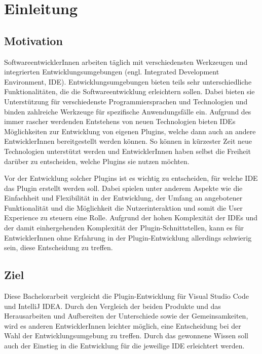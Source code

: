 \chapter{Einleitung}
\label{cha:Einleitung}


\section{Motivation}
\label{sec:Motivation}

SoftwareentwicklerInnen arbeiten täglich mit verschiedensten 
Werkzeugen und integrierten Entwicklungsumgebungen 
(engl. Integrated Development Environment, IDE). Entwicklungsumgebungen 
bieten teils sehr unterschiedliche Funktionalitäten, die 
die Softwareentwicklung erleichtern sollen. Dabei bieten 
sie Unterstützung für verschiedenste Programmiersprachen 
und Technologien und binden zahlreiche Werkzeuge für 
spezifische Anwendungsfälle ein. Aufgrund des immer rascher
werdenden Entstehens von neuen Technologien bieten
IDEs Möglichkeiten zur Entwicklung von eigenen 
Plugins, welche dann auch an andere EntwicklerInnen 
bereitgestellt werden können. So können in kürzester 
Zeit neue Technologien unterstützt werden und 
EntwicklerInnen haben selbst die Freiheit darüber zu 
entscheiden, welche Plugins sie nutzen möchten.

Vor der Entwicklung solcher Plugins ist es wichtig 
zu entscheiden, für welche IDE das Plugin erstellt 
werden soll. Dabei spielen unter anderem Aspekte wie 
die Einfachheit und Flexibilität in der Entwicklung, 
der Umfang an angebotener Funktionalität und die Möglichkeit
die Nutzerinteraktion und somit die User Experience 
zu steuern eine Rolle. Aufgrund der hohen 
Komplexität der IDEs und der damit einhergehenden 
Komplexität der Plugin-Schnittstellen, kann es für EntwicklerInnen
ohne Erfahrung in der Plugin-Entwicklung allerdings schwierig sein,
diese Entscheidung zu treffen.

\section{Ziel}
\label{sec:Ziel}

Diese Bachelorarbeit vergleicht die Plugin-Entwicklung 
für Visual Studio Code und IntelliJ IDEA. 
Durch den Vergleich der beiden Produkte 
und das Herausarbeiten und Aufbereiten der Unterschiede 
sowie der Gemeinsamkeiten, wird es anderen 
EntwicklerInnen leichter möglich, eine Entscheidung
bei der Wahl der Entwicklungsumgebung zu treffen.
Durch das gewonnene Wissen soll auch der Einstieg
in die Entwicklung für die jeweilige IDE erleichtert werden.

